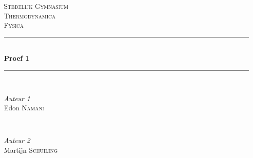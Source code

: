 \begin{titlepage} 
	\newcommand{\HRule}{\rule{\linewidth}{0.5mm}} %
	
	\center %
	
	
	\textsc{\LARGE Stedelijk Gymnasium}\\[1.5cm] %
	
	\textsc{\Large Thermodynamica}\\[0.5cm] %
	
	\textsc{\large Fysica}\\[0.5cm] %
	
	
	\HRule\\[0.4cm] %
	
	{\huge\bfseries Proef 1}\\[0.4cm] %
	
	\HRule\\[1.5cm]
	
	
	\begin{minipage}{0.4\textwidth}
		\begin{flushleft} %
			\large
			\textit{Auteur 1}\\
			Edon \textsc{Namani} %
		\end{flushleft}
	\end{minipage}
	~ %
	\begin{minipage}{0.4\textwidth}
		\begin{flushright} %
			\large
			\textit{Auteur 2}\\
			Martijn \textsc{Schuiling} %
		\end{flushright}
	\end{minipage}



\end{titlepage}

